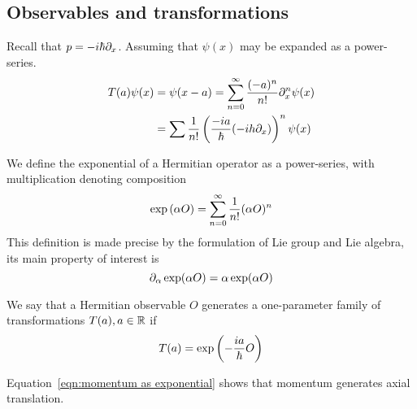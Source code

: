 \subsection{Observables and transformations}

Recall that $p = -i\hbar \partial_{x}$. Assuming that $\psi(x)$ may be expanded as a power-series.  
\begin{equation}\begin{aligned}\label{eqn:momentum as exponential}
    T(a)\psi(x)&=\psi(x-a)=\sum_{n=0}^\infty \dfrac{(-a)^n}{n!}\partial_{x}^n\psi(x)  \\ 
                &= \sum \dfrac 1 {n!} \left(\dfrac{-ia}{\hbar}(-ih\partial_{x})\right)^n \psi(x)
\end{aligned}\end{equation}

\begin{definition}
    We define the exponential of a Hermitian operator as a power-series, 
    with multiplication denoting composition
    \begin{equation}
        \exp\left(\alpha O\right) = \sum_{n=0}^\infty \dfrac 1 {n!} (\alpha O)^n
    \end{equation}
    This definition is made precise by the formulation of Lie group and Lie algebra, 
    its main property of interest is 
    \begin{equation}
        \partial_{\alpha} \exp(\alpha O) = \alpha \exp(\alpha O)
    \end{equation}
\end{definition}
\begin{definition}
    We say that a Hermitian observable $O$ generates a one-parameter family of 
    transformations $T(a), a\in \mathbb R$ if 
    \begin{equation} 
        T(a)=\exp\left(-\dfrac {i a}{\hbar} O\right)
    \end{equation}
\end{definition}
Equation~\ref{eqn:momentum as exponential} shows that momentum generates axial translation. 

